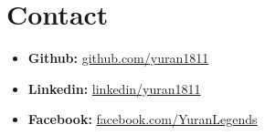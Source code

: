 \documentclass[letterpaper,11pt]{article}
\begin{document}
\section{Contact}
\begin{itemize}[leftmargin=*]\small
	\item \textbf{Github:} \href{https://github.com/yuran1811}{github.com/yuran1811}\vspace{-5pt}
	\item \textbf{Linkedin:} \href{https://www.linkedin.com/in/yuran1811}{linkedin/yuran1811}\vspace{-5pt}
	\item \textbf{Facebook:} \href{https://www.facebook.com/YuranLegends}{facebook.com/YuranLegends}\vspace{-5pt}
\end{itemize}
\end{document}
